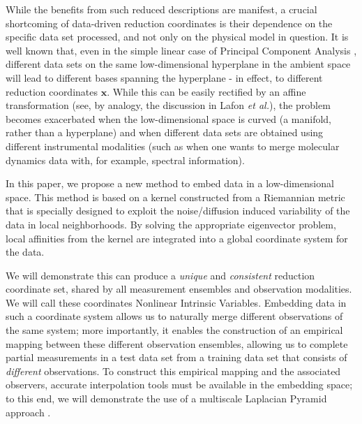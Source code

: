 While the benefits from such reduced descriptions are manifest, a crucial shortcoming of
 data-driven reduction coordinates is their dependence on the specific data set processed,
and not only on the physical model in question.
%
It is well known that, even in the simple linear case of Principal Component Analysis \cite{jolliffe2005principal},
different data sets on the same low-dimensional hyperplane in the ambient space
will lead to different bases spanning the hyperplane - in effect, to different reduction coordinates $\mathbf{x}$.
%
While this can be easily rectified by an affine transformation
(see, by analogy, the discussion in Lafon {\em et al.}\cite{lafon2006data}),
the problem becomes
exacerbated when the low-dimensional space is curved (a manifold, rather than a hyperplane)
and when different data sets are obtained using different instrumental modalities
(such as when one wants to merge molecular dynamics data with, for example, spectral information).
%

In this paper, we propose a new method to embed data in a low-dimensional space.
%
This method is based on a kernel constructed from a Riemannian metric that is specially designed to exploit the noise/diffusion induced variability of the data in local neighborhoods.
%
By solving the appropriate eigenvector problem, local affinities from the kernel are integrated into a global coordinate system for the data.

We will demonstrate this can produce a {\em unique} and {\em consistent} reduction
coordinate set, shared by all measurement ensembles and observation modalities.
%
We will call these coordinates Nonlinear Intrinsic Variables.
%
Embedding data in such a coordinate system allows us to naturally merge different observations of the same system;
more importantly, it enables the construction of an empirical mapping between these different
observation ensembles, allowing us to complete partial measurements in a test data set from a training data set
that consists of {\em different} observations.
%
To construct this empirical mapping and the associated observers,
accurate interpolation tools must be available in the embedding space; to this
end, we will demonstrate the use of a multiscale Laplacian Pyramid approach \cite{rabin2012heterogeneous}.


